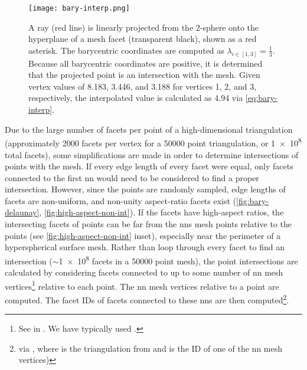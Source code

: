 \documentclass[final,12pt]{elsarticle}
\begin{document}
\begin{figure}
	\centering
	\texttt{[image: bary-interp.png]}
	\caption{A ray (red line) is linearly projected from the 2-sphere onto the hyperplane of a mesh facet (transparent black), shown as a red asterisk. The barycentric coordinates are computed as $\lambda_{i \in [1,3]} = \frac{1}{3}$. Because all barycentric coordinates are positive, it is determined that the projected point is an intersection with the mesh. Given vertex values of \num{8.183}, \num{3.446}, and \num{3.188} for vertices 1, 2, and 3, respectively, the interpolated value is calculated as \num{4.94} via \cref{eq:bary-interp}.}
	\label{fig:bary-interp}
\end{figure}
%
%
Due to the large number of facets per point of a high-dimensional triangulation (approximately \num{2000} facets per vertex for a \num{50000} point triangulation, or \num{1e8} total facets), some simplifications are made in order to determine intersections of \outpt{} points with the mesh. If every edge length of every facet were equal, only facets connected to the first \gls{nn} would need to be considered to find a proper intersection. However, since the points are randomly sampled, edge lengths of facets are non-uniform, and non-unity aspect-ratio facets exist (\cref{fig:bary-delaunay}, \cref{fig:high-aspect-non-int}). If the facets have high-aspect ratios, the intersecting facets of \outpt{} points can be far from the \glspl{nn} mesh points relative to the \outpt{} points (see \cref{fig:high-aspect-non-int} inset), especially near the perimeter of a hyperspherical surface mesh. Rather than loop through every facet to find an intersection ($\sim$\num{1e8} facets in a \num{50000} point mesh), the \outpt{} point intersections are calculated by considering facets connected to up to some number of \gls{nn} mesh vertices\footnote{See  in . We have typically used . } relative to each \outpt{} point. The \gls{nn} mesh vertices relative to a \outpt{} point are computed. The facet IDs of facets connected to these \glspl{nn} are then computed\footnote{via , where  is the triangulation from  and  is the ID of one of the \gls{nn} mesh vertices)}.
\end{document}

